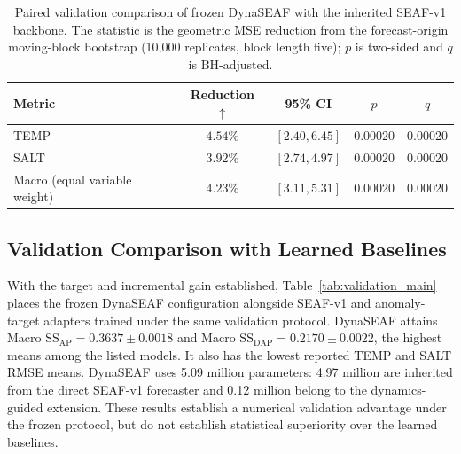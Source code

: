 \documentclass[conference]{IEEEtran}
\begin{document}
\begin{table}[!t]
\centering
\caption{Paired validation comparison of frozen DynaSEAF with the inherited SEAF-v1 backbone. The statistic is the geometric MSE reduction from the forecast-origin moving-block bootstrap (10,000 replicates, block length five); $p$ is two-sided and $q$ is BH-adjusted.}
\label{tab:dynaseaf_paired}
\scriptsize
\setlength{\tabcolsep}{3.5pt}
\renewcommand{\arraystretch}{1.05}
\begin{tabular}{lcccc}
\toprule
Metric & Reduction $\uparrow$ & 95\% CI & $p$ & $q$ \\
\midrule
TEMP & $4.54\%$ & $[2.40,6.45]$ & 0.00020 & 0.00020 \\
SALT & $3.92\%$ & $[2.74,4.97]$ & 0.00020 & 0.00020 \\
Macro (equal variable weight) & $4.23\%$ & $[3.11,5.31]$ & 0.00020 & 0.00020 \\
\bottomrule
\end{tabular}
\end{table}

\subsection{Validation Comparison with Learned Baselines}
With the target and incremental gain established, Table~\ref{tab:validation_main} places the frozen DynaSEAF configuration alongside SEAF-v1 and anomaly-target adapters trained under the same validation protocol. DynaSEAF attains Macro $\mathrm{SS}_{\mathrm{AP}}=0.3637\pm0.0018$ and Macro $\mathrm{SS}_{\mathrm{DAP}}=0.2170\pm0.0022$, the highest means among the listed models. It also has the lowest reported TEMP and SALT RMSE means. DynaSEAF uses 5.09 million parameters: 4.97 million are inherited from the direct SEAF-v1 forecaster and 0.12 million belong to the dynamics-guided extension. These results establish a numerical validation advantage under the frozen protocol, but do not establish statistical superiority over the learned baselines.
\end{document}
